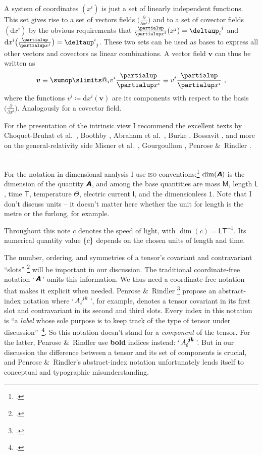 \documentclass[\ifafour a4paper,12pt,\else a5paper,10pt,\fi%
onecolumn,oneside,article,%
british%
]{memoir}
\makeatletter
\newcommand*{\mathquote}[1]{`\,#1\,'}
\theoremstyle{remark}
\theoremstyle{innote}
\def\sum{\DOTSI\sumop\slimits@}
\newcommand*{\mathte}[1]{\textbf{\textit{\textsf{#1}}}}
\newcommand*{\citep}{\footcites}
\newcommand*{\citey}{\parencites*}%
\newcommand*{\amp}{\&}
\newcommand*{\de}{\partialup}%
\newcommand*{\delt}{\deltaup}%
\newcommand*{\di}{\mathrm{d}}%
\newcommand*{\defd}{\coloneqq}
\DeclarePairedDelimiter\set{\{}{\}}
\renewcommand*{\|}[1][]{\nonscript\,#1\vert\nonscript\;\mathopen{}}
\newcommand*{\sect}{\S}%
\newcommand*{\chap}{ch.}%
\newcommand*{\etal}{{et al.}}
\newcommand*{\Un}{\textsf{1}}
\newcommand*{\Le}{\textsf{L}}
\newcommand*{\Ti}{\textsf{T}}
\newcommand*{\Ma}{\textsf{M}}
\newcommand*{\Te}{\Theta}
\newcommand*{\Cu}{\textsf{I}}
\newcommand*{\yA}{\mathte{A}}
\newcommand*{\yv}{\bm{v}}
\renewcommand*{\i}{\indices}
\newcommand*{\dex}[1][i]{\frac{\de}{\de x^{#1}}}
\newcommand*{\dix}[1][i]{\di x^{#1}}
\makeatother
\begin{document}
A system of coordinates $(x^{i})$ is just a set of linearly independent
functions. This set gives rise to a set of vectors fields
$\bigl(\dex\bigr)$ and to a set of covector fields $(\dix)$ by the obvious
requirements that $\dex(x^{j})=\delt\i{_{i}^{j}}$ and
$\dix\bigl(\dex[j]\bigr)=\delt\i{^{i}_{j}}$. These two sets can be used as bases
to express all other vectors and covectors as linear combinations. A
vector field $\yv$ can thus be written as
\begin{equation}
  \label{eq:vector_intrinsic}
  \yv \equiv \sum_{i}v^{i}\dex \equiv v^{i}\dex \ ,
\end{equation}
where the functions $v^{i}\defd \dix(\yv)$ are its components with respect
to the basis $\bigl(\dex\bigr)$. Analogously for a covector field.

\medskip

For the presentation of the intrinsic view I recommend the excellent texts
by Choquet-Bruhat \etal\ \citey{choquetbruhatetal1977_r1996}, Boothby
\citey{boothby1975_r2003}, Abraham \etal\ \citey{abrahametal1983_r1988},
Burke \citey{burke1985_r1987}, Bossavit \citey{bossavit1991}, and more on
the general-relativity side Misner \etal\
\citey[\chap~9]{misneretal1970_r1973}, Gourgoulhon
\citey[\chap~2]{gourgoulhon2007_r2012}, Penrose \amp\ Rindler
\citey{penroseetal1984_r2003}. \textcolor{white}{If you find this
  you can claim a postcard from me.}

\bigskip

For the notation in dimensional analysis I use \textsc{iso}
conventions:\citep[\sect~5]{iso2009} $\dim(\yA)$ is the dimension of the
quantity $\yA$, and among the base quantities are mass $\Ma$, length $\Le$,
time $\Ti$, temperature $\Te$, electric current $\Cu$, and the
dimensionless $\Un$. Note that I don't discuss units -- it doesn't matter
here whether the unit for length is the metre or the furlong, for example.

Throughout this note $c$ denotes the speed of light, with
$\dim(c) = \Le\Ti^{-1}$. Its numerical quantity value $\set{c}$ depends on
the chosen units of length and time.

The number, ordering, and symmetries of a tensor's covariant and
contravariant \enquote{slots} \citep[\sect~3.2]{misneretal1970_r1973} will
be important in our discussion. The traditional coordinate-free notation
\mathquote{$\yA$} omits this information. We thus need a coordinate-free
notation that makes it explicit when needed. Penrose \amp\ Rindler
\citep[\sect~2.2]{penroseetal1984_r2003} propose an abstract-index notation
where \mathquote{$A\i{_{i}^{jk}}$}, for example, denotes a tensor covariant
in its first slot and contravariant in its second and third slots. Every
index in this notation is \enquote{a \emph{label} whose sole purpose is to
  keep track of the type of tensor under
  discussion}~\citep[p.~75]{penroseetal1984_r2003}. So this notation
doesn't stand for a \emph{component} of the tensor. For the latter, Penrose
\amp\ Rindler use \textbf{bold} indices instead:
\mathquote{$A\i{_{\pmb{i}}^{\pmb{j}\pmb{k}}}$}. But in our discussion the
difference between a tensor and its set of components is crucial, and
Penrose \amp\ Rindler's abstract-index notation unfortunately lends itself
to conceptual and typographic misunderstanding.
\end{document}
